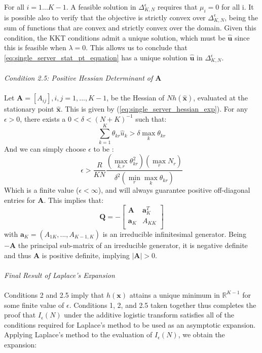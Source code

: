 For all \(i = 1...K-1\). A feasible solution in \(\Delta_{K,N}^{\epsilon}\) requires that \(\mu_i = 0\) for all i. It is possible also to verify that the objective is strictly convex over \(\Delta_{K,N}^{\epsilon}\), being the sum of functions that are convex and strictly convex over the domain. Given this condition, the KKT conditions admit a unique solution, which must be \(\mathbf{\hat{u}}\) since this is feasible when \(\lambda = 0\). This allows us to conclude that \ref{eq:single_server_stat_pt_equation} has a unique solution \(\mathbf{\hat{u}}\) in \(\Delta_{K,N}^{\epsilon}\).
\\\\
\textit{\large{Condition 2.5: Positive Hessian Determinant of \(\mathbf{A}\)}}
\\\\
Let \(\mathbf{A} = [A_{ij}] , i,j = 1,...,K-1\), be the Hessian of \(Nh(\mathbf{\hat{x}})\), evaluated at the stationary point \(\mathbf{\hat{x}}\). This is given by (\ref{eq:single_server_hessian_exp}). For any \(\epsilon > 0\), there exists a \(0 < \delta < (N+K)^{-1} \) such that:
\[ \sum_{k=1}^{K} \theta_{kr}\hat{u}_k > \delta \max_k \theta_{kr}\]
And we can simply choose \(\epsilon\) to be :
\[\epsilon > \frac{R}{KN} \frac{(\max_{k,r} \theta_{kr}^2) (\max_r N_r)}{\delta^2 (\min_r \max_k \theta_{kr})} \]
Which is a finite value (\(\epsilon < \infty\)), and will always guarantee positive off-diagonal entries for \(\mathbf{A}\). This implies that:
\begin{equation}
    \mathbf{Q} = - \begin{bmatrix} 
        \mathbf{A} & \mathbf{a}_K^T \\
        \mathbf{a}_K & A_{KK} \\
    \end{bmatrix}
\end{equation}
with \(\mathbf{a}_K = (A_{1K}, ... , A_{K-1,K})\) is an irreducible infinitesimal generator. Being \(- \mathbf{A}\) the principal sub-matrix of an irreducible generator, it is negative definite and thus \(\mathbf{A}\) is positive definite, implying \(|\mathbf{A}| > 0\).
\\\\
\textit{\large{Final Result of Laplace's Expansion}}
\\\\
Conditions 2 and 2.5 imply that \(h(\mathbf{x})\) attains a unique minimum in \(\mathbb{R}^{K-1}\) for some finite value of \(\epsilon\). Conditions 1, 2, and 2.5 taken together thus completes the proof that \(I_\epsilon (N)\) under the additive logistic transform satisfies all of the conditions required for Laplace's method to be used as an asymptotic expansion. Applying Laplace's method to the evaluation of \(I_\epsilon(N)\), we obtain the expansion:
